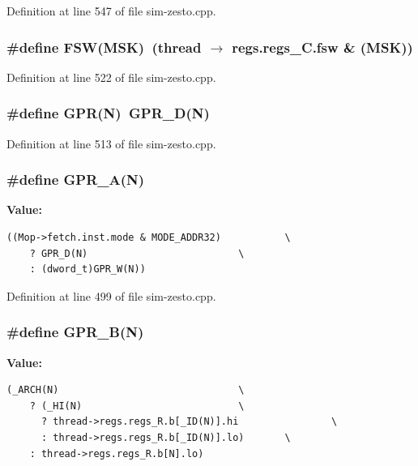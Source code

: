 Definition at line 547 of file sim-zesto.cpp.
\subsubsection[{FSW}]{\setlength{\rightskip}{0pt plus 5cm}\#define FSW(MSK)~(thread $\rightarrow$ regs.regs\_\-C.fsw \& (MSK))}\label{sim-zesto_8cpp_1a0c942425e8394d87a1262793048912}




Definition at line 522 of file sim-zesto.cpp.
\subsubsection[{GPR}]{\setlength{\rightskip}{0pt plus 5cm}\#define GPR(N)~GPR\_\-D(N)}\label{sim-zesto_8cpp_33a09842f2467a215179ba1c4e09653f}




Definition at line 513 of file sim-zesto.cpp.
\subsubsection[{GPR\_\-A}]{\setlength{\rightskip}{0pt plus 5cm}\#define GPR\_\-A(N)}\label{sim-zesto_8cpp_fe3b1fb9d4a9bfd28f1f0536e6a52094}


\textbf{Value:}

\begin{Code}\begin{verbatim}((Mop->fetch.inst.mode & MODE_ADDR32)           \
    ? GPR_D(N)                          \
    : (dword_t)GPR_W(N))
\end{verbatim}
\end{Code}


Definition at line 499 of file sim-zesto.cpp.
\subsubsection[{GPR\_\-B}]{\setlength{\rightskip}{0pt plus 5cm}\#define GPR\_\-B(N)}\label{sim-zesto_8cpp_841ea8fd08139832b659b3ff0d6f0e3d}


\textbf{Value:}

\begin{Code}\begin{verbatim}(_ARCH(N)                               \
    ? (_HI(N)                           \
      ? thread->regs.regs_R.b[_ID(N)].hi                \
      : thread->regs.regs_R.b[_ID(N)].lo)       \
    : thread->regs.regs_R.b[N].lo)
\end{verbatim}
\end{Code}


